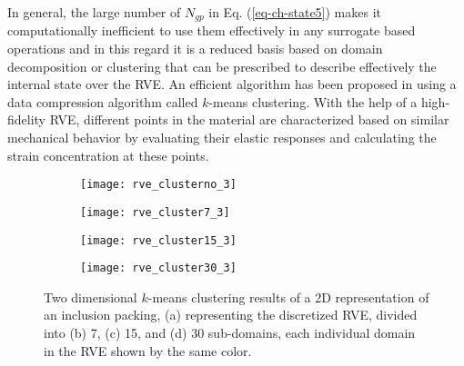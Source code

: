 In general, the large number of $ N_{gp} $ in Eq. (\ref{eq-ch-state5}) makes it computationally inefficient to use them effectively in any surrogate based operations and in this regard it is a reduced basis based on domain decomposition or clustering that can be prescribed to describe effectively the internal state over the RVE. An efficient algorithm has been proposed in \cite{liuSelfconsistentClusteringAnalysis2016} using a data compression algorithm called $ k $-means clustering. With the help of a high-fidelity RVE, different points in the material are characterized based on similar mechanical behavior by evaluating their elastic responses and calculating the strain concentration at these points\cite{baiHighfidelityMicroscaleModeling2015}. 




\begin{figure}
	\centering
	\begin{subfigure}[t]{0.45\textwidth}
		\texttt{[image: rve\_clusterno\_3]}
		\caption{}
	\end{subfigure}
	\begin{subfigure}[t]{0.45\textwidth}
		\texttt{[image: rve\_cluster7\_3]}
		\caption{}
	\end{subfigure}
	\begin{subfigure}[t]{0.45\textwidth}
		\texttt{[image: rve\_cluster15\_3]}
		\caption{}
	\end{subfigure}
	\begin{subfigure}[t]{0.45\textwidth}
		\texttt{[image: rve\_cluster30\_3]}
		\caption{}
	\end{subfigure}
	\caption{Two dimensional $ k $-means clustering results of a 2D representation of an inclusion packing, (a) representing the discretized RVE, divided into (b) 7, (c) 15, and (d) 30 sub-domains, each individual domain in the RVE shown by the same color. }\label{fig-ch-cluster}
\end{figure}

